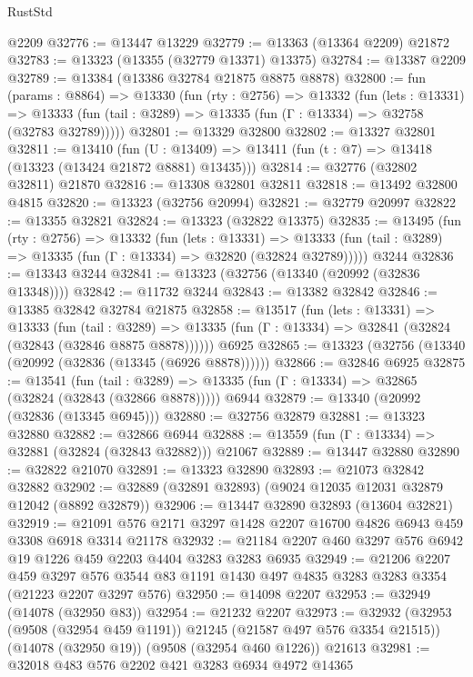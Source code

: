 \begin{lexlean}{RustStd}
\begin{coremodule}
    @2209
@32776 := @13447 @13229
@32779 := @13363 (@13364 @2209) @21872
@32783 := @13323 (@13355 (@32779 @13371) @13375)
@32784 := @13387 @2209
@32789 := @13384 (@13386 @32784 @21875 @8875 @8878)
@32800 := fun (params : @8864) =>
  @13330
    (fun (rty : @2756) =>
    @13332
      (fun (lets : @13331) =>
      @13333 (fun (tail : @3289) => @13335 (fun (Γ : @13334) => @32758 (@32783 @32789)))))
@32801 := @13329 @32800
@32802 := @13327 @32801
@32811 := @13410
    (fun (U : @13409) => @13411 (fun (t : @7) => @13418 (@13323 (@13424 @21872 @8881) @13435)))
@32814 := @32776 (@32802 @32811) @21870
@32816 := @13308 @32801 @32811
@32818 := @13492 @32800 @4815
@32820 := @13323 (@32756 @20994)
@32821 := @32779 @20997
@32822 := @13355 @32821
@32824 := @13323 (@32822 @13375)
@32835 := @13495
    (fun (rty : @2756) =>
    @13332
      (fun (lets : @13331) =>
      @13333 (fun (tail : @3289) => @13335 (fun (Γ : @13334) => @32820 (@32824 @32789)))))
    @3244
@32836 := @13343 @3244
@32841 := @13323 (@32756 (@13340 (@20992 (@32836 @13348))))
@32842 := @11732 @3244
@32843 := @13382 @32842
@32846 := @13385 @32842 @32784 @21875
@32858 := @13517
    (fun (lets : @13331) =>
    @13333
      (fun (tail : @3289) =>
      @13335 (fun (Γ : @13334) => @32841 (@32824 (@32843 (@32846 @8875 @8878))))))
    @6925
@32865 := @13323 (@32756 (@13340 (@20992 (@32836 (@13345 (@6926 @8878))))))
@32866 := @32846 @6925
@32875 := @13541
    (fun (tail : @3289) => @13335 (fun (Γ : @13334) => @32865 (@32824 (@32843 (@32866 @8878)))))
    @6944
@32879 := @13340 (@20992 (@32836 (@13345 @6945)))
@32880 := @32756 @32879
@32881 := @13323 @32880
@32882 := @32866 @6944
@32888 := @13559 (fun (Γ : @13334) => @32881 (@32824 (@32843 @32882))) @21067
@32889 := @13447 @32880
@32890 := @32822 @21070
@32891 := @13323 @32890
@32893 := @21073 @32842 @32882
@32902 := @32889 (@32891 @32893) (@9024 @12035 @12031 @32879 @12042 (@8892 @32879))
@32906 := @13447 @32890 @32893 (@13604 @32821)
@32919 := @21091 @576 @2171 @3297 @1428 @2207 @16700 @4826 @6943 @459 @3308 @6918 @3314 @21178
@32932 := @21184 @2207 @460 @3297 @576 @6942 @19 @1226 @459 @2203 @4404 @3283 @3283 @6935
@32949 := @21206
    @2207
    @459
    @3297
    @576
    @3544
    @83
    @1191
    @1430
    @497
    @4835
    @3283
    @3283
    @3354
    (@21223 @2207 @3297 @576)
@32950 := @14098 @2207
@32953 := @32949 (@14078 (@32950 @83))
@32954 := @21232 @2207
@32973 := @32932
    (@32953 (@9508 (@32954 @459 @1191)) @21245 (@21587 @497 @576 @3354 @21515))
    (@14078 (@32950 @19))
    (@9508 (@32954 @460 @1226))
    @21613
@32981 := @32018 @483 @576 @2202 @421 @3283 @6934 @4972 @14365

\end{coremodule}
\end{lexlean}

